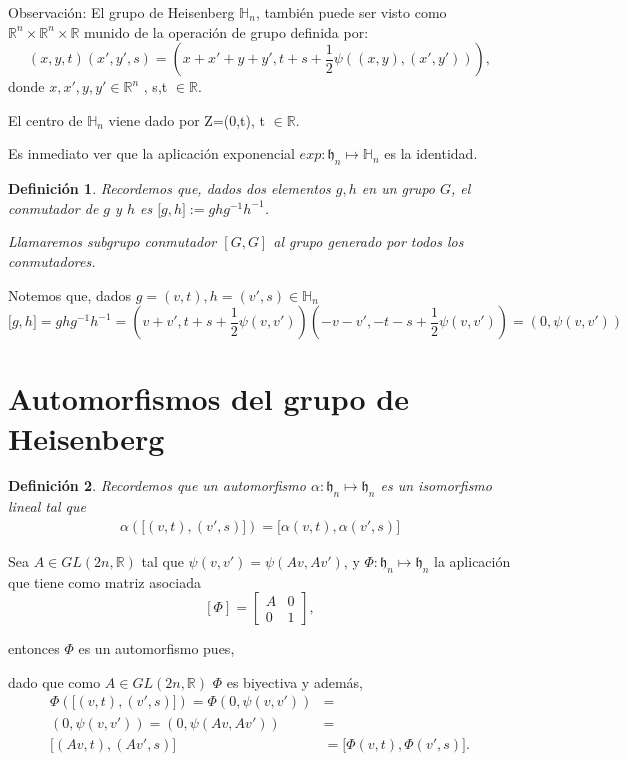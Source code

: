 \documentclass[12pt]{article}
\newtheorem{definition}{Definición}
\begin{document}
Observación:
 El grupo de Heisenberg $\mathbb{H}_n$, también puede ser visto como $\mathbb{R}^{n} \times \mathbb{R}^{n} \times \mathbb{R}$ munido
 de la operación de grupo definida por: 
 $$(x,y,t)(x',y',s)=(x+x'+y+y',t+s + \frac{1}{2} \psi((x,y),(x',y'))),$$
 donde $x,x',y,y' \in \mathbb{R}^{n}$ , s,t $\in \mathbb{R}$.




El centro de $\mathbb{H}_n$ viene dado por Z=(0,t), t $\in \mathbb{R}.$


Es inmediato ver que la aplicación exponencial $exp: \mathfrak{h}_n \mapsto \mathbb{H}_n$ es la identidad.
\begin{definition}
 Recordemos que, dados dos elementos $g,h$ en un grupo $G$, el conmutador de $g$ y $h$ es ${[}g,h{]}:=g h g^{-1} h^{-1}$.
 
 Llamaremos subgrupo conmutador $[G,G]$ al grupo generado por todos los conmutadores.
\end{definition}
Notemos que, dados $g=(v,t),h=(v',s) \in \mathbb{H}_n$
$$
{[}g,h{]}=g h g^{-1} h^{-1}=(v+v',t+s+\frac{1}{2}\psi(v,v')) (-v-v',-t-s + \frac{1}{2}\psi(v,v'))=(0,\psi(v,v'))
$$

\section{Automorfismos del grupo de Heisenberg}
\begin{definition}
 Recordemos que un automorfismo $\alpha: \mathfrak{h}_n \mapsto \mathfrak{h}_n$ es un isomorfismo lineal tal que 
 $$\begin{aligned}
    \alpha({[}(v,t),(v',s){]})={[}\alpha(v,t),\alpha(v',s){]}
 \end{aligned}$$
 

\end{definition}

Sea $A \in GL(2n,\mathbb{R})$ tal que  $\psi(v,v')=\psi(Av, Av')$, y  $\Phi:\mathfrak{h}_n \mapsto \mathfrak{h}_n$ la aplicación
que tiene como matriz asociada 
$$[\Phi] = 
\begin{bmatrix}
A & 0\\
0 & 1
\end{bmatrix},$$

entonces $\Phi$ es un automorfismo pues,

dado que como $A \in GL(2n,\mathbb{R})$ $\Phi$ es biyectiva y además,
$$\begin{aligned}
\Phi({[}(v,t),(v',s){]})=\Phi(0,\psi(v,v'))&=\\
(0,\psi(v,v'))=(0,\psi(Av,Av'))&=\\
{[}(Av,t),(Av',s){]}&={[}\Phi(v,t),\Phi(v',s){]}.\\
\end{aligned}$$
\end{document}
